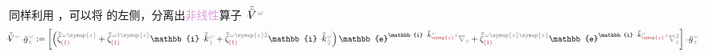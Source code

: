 同样利用 ，可以将  的左侧，分离出\textcolor{Plum}{非线性}算子 $\Xint{\mathcolor{gray}{-}}{21}{\bar{\bar{V}}}^{\;\! \mathcolor{gray}{\omega}}$
\begin{subequations}
\begin{align}
	\!\!\! \Xint{\mathcolor{gray}{-}}{25}{\bar{\bar{V}}}^{\;\! \mathcolor{gray}{\omega}} \Xint{{}^{}_{\mathcolor{gray}{-}}}{10}{\bar{g}}^{\;\!\mathcolor{gray}{\omega}}_{\;\! \mathcolor{gray}{z}} &:= \left[ \left( \bar{\bar{\zeta}}^{\;\! \mathcolor{gray}{\omega} \mathcolor{gray}{\symup{z}}}_{\textcolor{Maroon}{(1)}} + \bar{\bar{\zeta}}^{\;\! \mathcolor{gray}{\omega} \mathcolor{gray}{\check{1} \symup{z}}}_{\textcolor{Maroon}{(1)}} \mathbb{i} \Xint{\begin{smallmatrix} ~ \\ {}^{}_{\mathcolor{gray}{-}} \\ ~ \end{smallmatrix}}{15}{\bar{\bar{k}}}_{\;\! \mathcolor{gray}{\check{1}}}^{\;\! \mathcolor{gray}{\omega}} + \bar{\bar{\zeta}}^{\;\! \mathcolor{gray}{\omega} \mathcolor{gray}{\symup{z} \check{2}}}_{\textcolor{Maroon}{(1)}} \mathbb{i} \Xint{\begin{smallmatrix} ~ \\ {}^{}_{\mathcolor{gray}{-}} \\ ~ \end{smallmatrix}}{15}{\bar{\bar{k}}}_{\;\! \mathcolor{gray}{\check{2}}}^{\;\! \mathcolor{gray}{\omega}} \right) \mathbb{e}^{\mathbb{i} \Xint{\begin{smallmatrix} ~ \\ {}^{}_{\mathcolor{gray}{-}} \\ ~ \end{smallmatrix}}{15}{\bar{\bar{k}}}_{\textcolor{Maroon}{\symup{z}}}^{\;\! \mathcolor{gray}{\omega}} \mathcolor{gray}{z}} \mathcolor{gray}{\nabla_z} + \bar{\bar{\zeta}}^{\;\! \mathcolor{gray}{\omega} \mathcolor{gray}{\symup{z} \symup{z}}}_{\textcolor{Maroon}{(1)}} \mathbb{e}^{\mathbb{i} \Xint{\begin{smallmatrix} ~ \\ {}^{}_{\mathcolor{gray}{-}} \\ ~ \end{smallmatrix}}{15}{\bar{\bar{k}}}_{\textcolor{Maroon}{\symup{z}}}^{\;\! \mathcolor{gray}{\omega}} \mathcolor{gray}{z}} \mathcolor{gray}{\nabla_z^2} \right] \Xint{{}^{}_{\mathcolor{gray}{-}}}{10}{\bar{g}}^{\;\!\mathcolor{gray}{\omega}}_{\;\! \mathcolor{gray}{z}} \label{eq:matrix_exp_eq-left_V} \\

\end{align}
\end{subequations}
